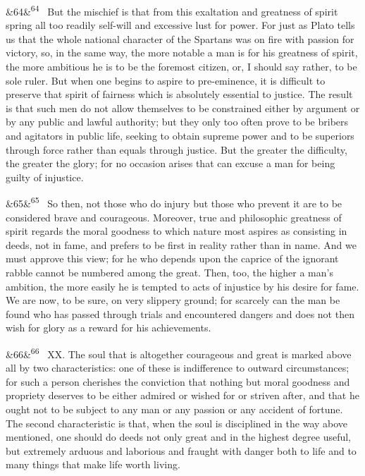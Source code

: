 \documentclass[12pt]{article}
\newcommand{\para}[1][]{\par\noindent\ifx&#1&\else\textsuperscript{\footnotesize #1}~\fi}
\begin{document}
\para[64] But the mischief is that from this exaltation and greatness of spirit spring all too readily self-will and excessive lust for power. For just as Plato tells us that the whole national character of the Spartans was on fire with passion for victory, so, in the same way, the more notable a man is for his greatness of spirit, the more ambitious he is to be the foremost citizen, or, I should say rather, to be sole ruler. But when one begins to aspire to pre-eminence, it is difficult to preserve that spirit of fairness which is absolutely essential to justice. The result is that such men do not allow themselves to be constrained either by argument or by any public and lawful authority; but they only too often prove to be bribers and agitators in public life, seeking to obtain supreme power and to be superiors through force rather than equals through justice. But the greater the difficulty, the greater the glory; for no occasion arises that can excuse a man for being guilty of injustice.

\para[65] So then, not those who do injury but those who prevent it are to be considered brave and courageous. Moreover, true and philosophic greatness of spirit regards the moral goodness to which nature most aspires as consisting in deeds, not in fame, and prefers to be first in reality rather than in name. And we must approve this view; for he who depends upon the caprice of the ignorant rabble cannot be numbered among the great. Then, too, the higher a man's ambition, the more easily he is tempted to acts of injustice by his desire for fame. We are now, to be sure, on very slippery ground; for scarcely can the man be found who has passed through trials and encountered dangers and does not then wish for glory as a reward for his achievements.

\para[66] XX. The soul that is altogether courageous and great is marked above all by two characteristics: one of these is indifference to outward circumstances; for such a person cherishes the conviction that nothing but moral goodness and propriety deserves to be either admired or wished for or striven after, and that he ought not to be subject to any man or any passion or any accident of fortune. The second characteristic is that, when the soul is disciplined in the way above mentioned, one should do deeds not only great and in the highest degree useful, but extremely arduous and laborious and fraught with danger both to life and to many things that make life worth living.
\end{document}
